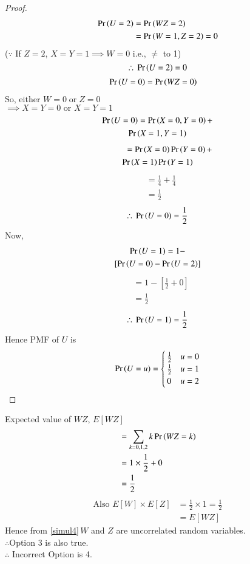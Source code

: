 \documentclass[journal,12pt,twocolumn]{IEEEtran}
\begin{document}
\begin{enumerate}
\begin{proof}
\begin{align}
    \Pr\left(U=2\right) &=\Pr\left(WZ =2\right) \\
             &= \Pr\left(W=1,Z=2\right) =0
\end{align}
($\because$ If $Z=2$, $X = Y =1 \implies W =0$ i.e., $\neq$ to 1)
$$\therefore\,\Pr\left(U=2\right)=0$$
\begin{align}
   \Pr\left(U=0\right) &=\Pr\left(WZ =0\right)
\end{align}
So, either $W=0\;\text{or}\;Z =0$\\
$\implies X=Y=0 \text{ or } X=Y=1$
\begin{multline}
       \Pr\left(U=0\right) = \Pr\left(X=0,Y=0\right) + \\ \Pr\left(X=1,Y=1\right) 
\end{multline}
\begin{multline}
\hspace{1cm}     = \Pr\left(X=0\right)\Pr\left(Y=0\right) +\\ \Pr\left(X=1\right)\Pr\left(Y=1\right)
\end{multline}
\begin{align}
    &= \frac{1}{4} + \frac{1}{4}\\
    &= \frac{1}{2}
\end{align}
$$\therefore\,\Pr\left(U=0\right) = \frac{1}{2}$$
Now,
\begin{multline}
    \Pr\left(U=1\right)= 1 -\\\left[\Pr\left(U =0\right) -\Pr\left(U =2\right)\right]
\end{multline}
\begin{align}
    &= 1 -\left[\frac{1}{2} + 0\right]\\
    &= \frac{1}{2}
\end{align}
$$\therefore\,\Pr\left(U=1\right) = \frac{1}{2}$$
Hence PMF of $U$ is
\begin{align}
    \Pr\left(U = u\right) = 
\begin{cases}
\frac{1}{2} & u=0
\\
\frac{1}{2} & u=1\\
0 & u=2
\end{cases}
\end{align}
\end{proof}
Expected value of $WZ$, $E[WZ]$
\begin{align}
    &= \sum_{k=0,1,2} k\Pr\left(WZ =k\right)\\
    &= 1 \times \frac{1}{2} +0\\
    &= \frac{1}{2} 
\end{align}
\begin{align}
    \text{Also } E[W]\times E[Z] &= \frac{1}{2}\times1 = \frac{1}{2}\\
                                 &= E[WZ] \label{simul4}
\end{align}
Hence from \eqref{simul4}\,$W$ and $Z$ are uncorrelated random variables.\\
$\therefore$Option 3 is also true.\\

$\therefore$ Incorrect Option is 4.
    
\end{enumerate}
 
\end{document}
